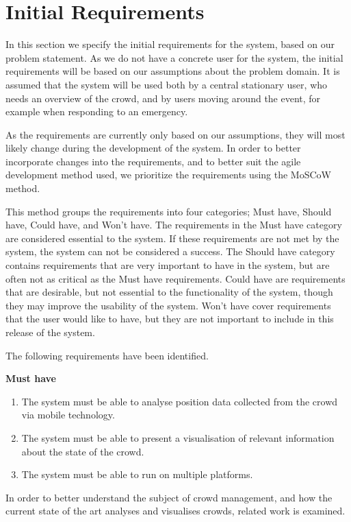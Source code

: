 \section{Initial Requirements}\label{sec:s1_requirements}


In this section we specify the initial requirements for the system, based on our problem statement. As we do not have a concrete user for the system, the initial requirements will be based on our assumptions about the problem domain. It is assumed that the system will be used both by a central stationary user, who needs an overview of the crowd, and by users moving around the event, for example when responding to an emergency. 

As the requirements are currently only based on our assumptions, they will most likely change during the development of the system. In order to better incorporate changes into the requirements, and to better suit the agile development method used, we prioritize the requirements using the MoSCoW method\cite{moscow}.

This method groups the requirements into four categories; Must have, Should have, Could have, and Won't have. The requirements in the Must have category are considered essential to the system. If these requirements are not met by the system, the system can not be considered a success. The Should have category contains requirements that are very important to have in the system, but are often not as critical as the Must have requirements. Could have are requirements that are desirable, but not essential to the functionality of the system, though they may improve the usability of the system. Won't have cover requirements that the user would like to have, but they are not important to include in this release of the system.

The following requirements have been identified.

\textbf{Must have}
\begin{enumerate}
    \item The system must be able to analyse position data collected from the crowd via mobile technology.
    \item The system must be able to present a visualisation of relevant information about the state of the crowd.
    \item The system must be able to run on multiple platforms.
\end{enumerate}

In order to better understand the subject of crowd management, and how the current state of the art analyses and visualises crowds, related work is examined.

